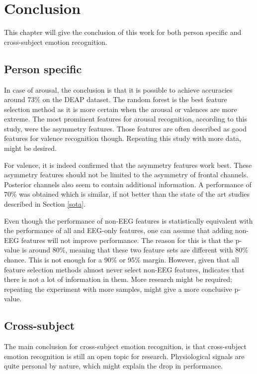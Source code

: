 \chapter{Conclusion}
{\samenvatting This chapter will give the conclusion of this work for both person specific and cross-subject emotion recognition.}

\section{Person specific}
In case of arousal, the conclusion is that it is possible to achieve accuracies around 73\% on the DEAP dataset. The random forest is the best feature selection method as it is more certain when the arousal or valences are more extreme. The most prominent features for arousal recognition, according to this study, were the asymmetry features. Those features are often described as good features for valence recognition though. Repeating this study with more data, might be desired.

\npar

For valence, it is indeed confirmed that the asymmetry features work best. These asymmetry features should not be limited to the asymmetry of frontal channels. Posterior channels also seem to contain additional information. A performance of 70\% was obtained which is similar, if not better than the state of the art studies described in Section \ref{sota}. 

\npar

Even though the performance of non-EEG features is statistically equivalent with the performance of all and EEG-only features, one can assume that adding non-EEG features will not improve performance. The reason for this is that the p-value is around 80\%, meaning that these two feature sets are different with 80\% chance. This is not enough for a 90\% or 95\% margin. However, given that all feature selection methods almost never select non-EEG features, indicates that there is not a lot of information in them. More research might be required; repeating the experiment with more samples, might give a more conclusive p-value.

\clearpage

\section{Cross-subject}

The main conclusion for cross-subject emotion recognition, is that cross-subject emotion recognition is still an open topic for research. Physiological signals are quite personal by nature, which might explain the drop in performance.

